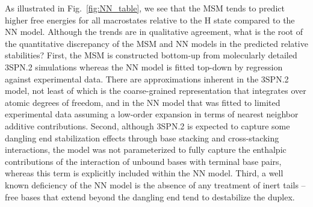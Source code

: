 \documentclass[journal=jpcbfk,manuscript=article]{achemso}
\newcommand*{\rood}[1]{{#1}}
\begin{document}
As illustrated in Fig.~\ref{fig:NN_table}, we see that the MSM tends to predict higher free energies for \rood{all macrostates relative to the H state compared to the NN model}. Although the trends are in qualitative agreement, what is the root of the quantitative discrepancy of the MSM and NN models in the predicted relative stabilities? First, the MSM is constructed bottom-up from molecularly detailed 3SPN.2 simulations whereas the NN model is fitted top-down by regression against experimental data. There are approximations inherent in the 3SPN.2 model, not least of which is the coarse-grained representation that integrates over atomic degrees of freedom, and in the NN model that was fitted to limited experimental data assuming a low-order expansion in terms of nearest neighbor additive contributions. Second, although 3SPN.2 is expected to capture some dangling end stabilization effects through base stacking and cross-stacking interactions, the model was not parameterized to fully capture the enthalpic contributions of the interaction of unbound bases with terminal base pairs, whereas this term is explicitly included within the NN model. Third, a well known deficiency of the NN model is the absence of any treatment of inert tails -- free bases that extend beyond the dangling end tend to destabilize the duplex.\citep{DiMichele2014EffectHybridization}
\end{document}
